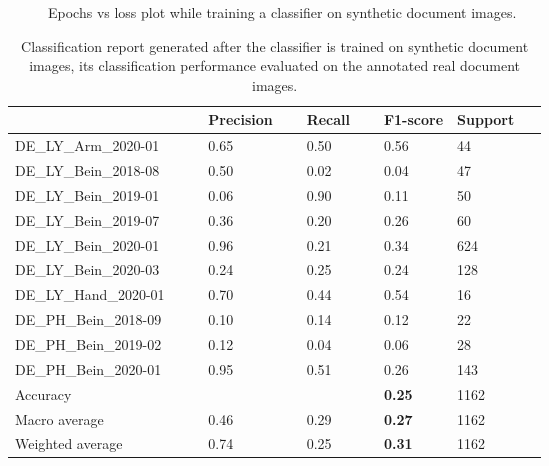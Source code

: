 \begin{figure}[H]
\begin{minipage}[b]{0.49\textwidth}
    \caption[Epochs vs loss plot while training a classifier on synthetic document images.]{Epochs vs loss plot while training a classifier on synthetic document images.}
    \label{fig:SyntheticClassifierLoss}
  \end{minipage}
\end{figure}


\begin{center}
\begin{table}[H]
    \centering
    \begin{center}
    \begin{tabular}{P{0.22\linewidth} P{0.10\linewidth} P{0.10\linewidth} P{0.10\linewidth} P{0.10\linewidth}} 
        \toprule
            & Precision & Recall & F1-score & Support\\[0.0ex] 
        \midrule
        DE\_LY\_Arm\_2020-01 & 0.65 & 0.50 & 0.56 & 44\\[0.0ex]
        \midrule
        DE\_LY\_Bein\_2018-08 & 0.50 & 0.02 & 0.04 & 47\\[0.0ex]
        \midrule
        DE\_LY\_Bein\_2019-01 & 0.06 & 0.90 & 0.11 & 50\\[0.0ex]
        \midrule
        DE\_LY\_Bein\_2019-07 & 0.36 & 0.20 & 0.26 & 60\\[0.0ex]
        \midrule
        DE\_LY\_Bein\_2020-01 & 0.96 & 0.21 & 0.34 & 624\\[0.0ex]
        \midrule
        DE\_LY\_Bein\_2020-03 & 0.24 & 0.25 & 0.24 & 128\\[0.0ex]
        \midrule
        DE\_LY\_Hand\_2020-01 & 0.70 & 0.44 & 0.54 & 16\\[0.0ex]
        \midrule
        DE\_PH\_Bein\_2018-09 & 0.10 & 0.14 & 0.12 & 22\\[0.0ex]
        \midrule
        DE\_PH\_Bein\_2019-02 & 0.12 & 0.04 & 0.06 & 28\\[0.0ex]
        \midrule
        DE\_PH\_Bein\_2020-01 & 0.95 & 0.51 & 0.26 & 143\\[0.0ex]
        \midrule
        \midrule
        Accuracy              &      &      & \bf{0.25} & 1162\\[0.0ex]
        Macro average             & 0.46 & 0.29 &  \bf{0.27} & 1162\\[0.0ex]
        Weighted average          & 0.74 & 0.25 &  \bf{0.31} & 1162\\[0.0ex]
        \bottomrule
    \end{tabular}
    \caption[Classification report generated after the classifier is trained on synthetic document images, its classification performance evaluated on the annotated real document images.]{Classification report generated after the classifier is trained on synthetic document images, its classification performance evaluated on the annotated real document images.}
    \label{table:SyntheticClassificationReport}
    \end{center}
\end{table}
\end{center}



